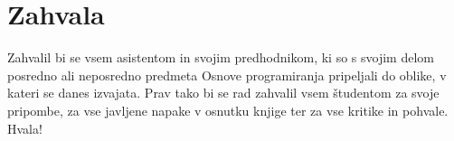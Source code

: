 \chapter*{Zahvala}

Zahvalil bi se vsem asistentom in svojim predhodnikom, ki so s svojim delom posredno ali neposredno predmeta Osnove programiranja pripeljali do oblike, v kateri se danes izvajata. Prav tako bi se rad zahvalil vsem študentom za svoje pripombe, za vse javljene napake v osnutku knjige ter za vse kritike in pohvale. Hvala!


